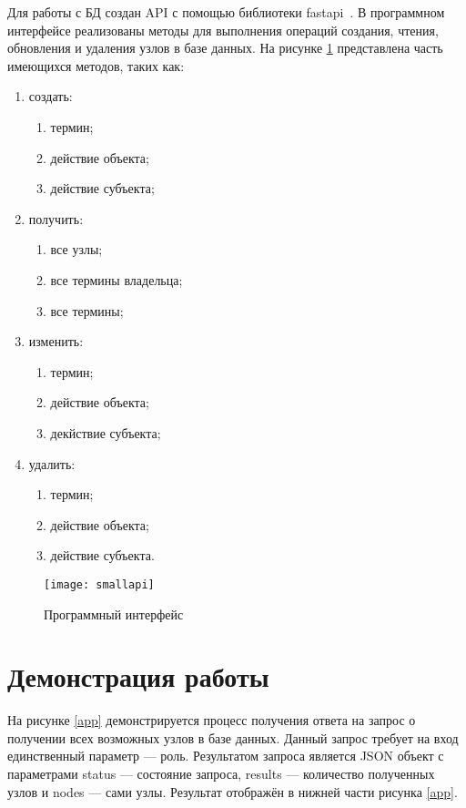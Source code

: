 Для работы с БД создан API с помощью библиотеки fastapi~\cite{fastapi}. 
В программном интерфейсе реализованы методы для выполнения операций создания, чтения, обновления и удаления узлов в базе данных.
На рисунке \ref{fastapi} представлена часть имеющихся методов, таких как:
\begin{enumerate}
	\item создать:
		\begin{enumerate}[label=\alph*.]
			\item термин;
			\item действие объекта;
			\item действие субъекта;
		\end{enumerate}
	\item получить:
	\begin{enumerate}[label=\alph*.]
		\item все узлы;
		\item все термины владельца;
		\item все термины;
	\end{enumerate}
	\item изменить:
	\begin{enumerate}[label=\alph*.]
		\item термин;
		\item действие объекта;
		\item декйствие субъекта;
	\end{enumerate}
	\item удалить:
	\begin{enumerate}[label=\alph*.]
		\item термин;
		\item действие объекта;
		\item действие субъекта.
	\end{enumerate}
\end{enumerate}

\begin{figure}[ht!]\centering
	\texttt{[image: smallapi]}
	\caption{Программный интерфейс}
	\label{fastapi}
\end{figure}

\pagebreak

\section{Демонстрация работы}

На рисунке \ref{app} демонстрируется процесс получения ответа на запрос о получении всех возможных узлов в базе данных. Данный запрос требует на вход единственный параметр --- роль. Результатом запроса является JSON объект с параметрами status --- состояние запроса, results --- количество полученных узлов и nodes --- сами узлы. Результат отображён в нижней части рисунка \ref{app}.

